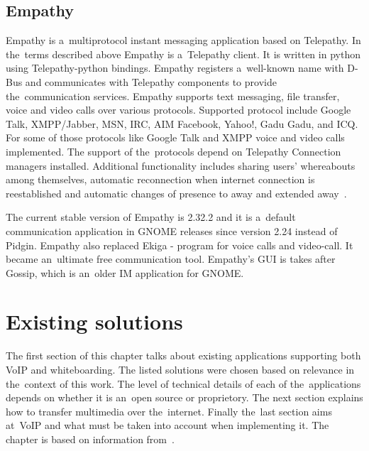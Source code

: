 
\section{Empathy}
Empathy is a~multiprotocol instant messaging application based on Telepathy. In the~terms described above Empathy is a~Telepathy client. It is written in python using Telepathy-python bindings. Empathy registers a~well-known name with D-Bus and communicates with Telepathy components to provide the~communication services. Empathy supports text messaging, file transfer, voice and video calls over various protocols. Supported protocol include Google Talk, XMPP/Jabber, MSN, IRC, AIM Facebook, Yahoo!, Gadu Gadu, and ICQ. For some of those protocols like Google Talk and XMPP voice and video calls implemented. The support of the~protocols depend on Telepathy Connection managers installed. Additional functionality includes sharing users' whereabouts among themselves, automatic reconnection when internet connection is reestablished and automatic changes of presence to away and extended away~\cite{empathyGnome}.

The current stable version of Empathy is 2.32.2 and it is a~default communication application in GNOME releases since version 2.24 instead of Pidgin. Empathy also replaced Ekiga - program for voice calls and video-call. It became an~ultimate free communication tool. Empathy's GUI is takes after Gossip, which is an~older IM application for GNOME. 


\chapter{Existing solutions}\label{chapter:existing-solutions}
The first section of this chapter talks about existing applications supporting both VoIP and whiteboarding. The listed solutions were chosen based on relevance in the~context of this work. The level of technical details of each of the~applications depends on whether it is an~open source or proprietory. The next section explains how to transfer multimedia over the~internet. Finally the~last section aims at~VoIP and what must be taken into account when implementing it. The chapter is based on information from~\cite{skypeProtocolAnalysis,voipPaper,digitalSpeechBook}.

